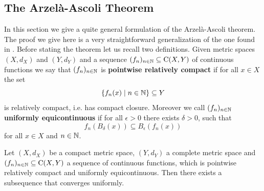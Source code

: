\subsection{The Arzelà-Ascoli Theorem}

In this section we give a quite general formulation of the Arzelà-Ascoli theorem. The proof we give here is a very straightforward generalization of the one found in \cite{werner2007funktionalanalysis}. Before stating the theorem let us recall two definitions. Given metric spaces $(X,d_X)$ and $(Y,d_Y)$ and a sequence $(f_n)_{n\in\mathbb{N}} \subseteq \mathrm{C}(X,Y)$ of continuous functions we say that $(f_n)_{n\in\mathbb{N}}$ is \textbf{pointwise relatively compact} if for all $x\in X$ the set 
\[
\{f_n(x) \mid n \in \mathbb{N}\} \subseteq Y
\] 
is relatively compact, i.e. has compact closure. Moreover we call $(f_n)_{n\in\mathbb{N}}$ \textbf{uniformly equicontinuous} if for all $\epsilon>0$ there exists $\delta>0$, such that 
\[
f_n(B_\delta(x)) \subseteq B_\epsilon(f_n(x))
\]
for all $x\in X$ and $n\in \mathbb{N}$.

\begin{theorem}
    \label{funkana:thm:arzela_ascoli}
    Let $(X,d_X)$ be a compact metric space, $(Y,d_Y)$ a complete metric space and $(f_n)_{n\in\mathbb{N}} \subseteq \mathrm{C}(X,Y)$ a sequence of continuous functions, which is pointwise relatively compact and uniformly equicontinuous. Then there exists a subsequence that converges uniformly.
\end{theorem}

